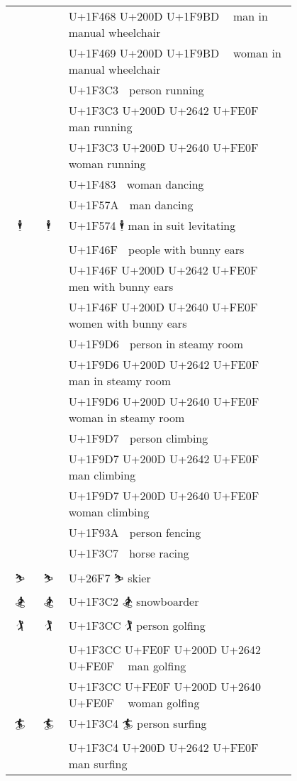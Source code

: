 \documentclass[a4paper,12pt]{article}
\newcommand{\fontA}[1]{{\fontspec[RawFeature={mode=harf,+dist,+ccmp}]{Segoe UI Emoji} #1}}
\newcommand{\fontB}[1]{{\fontspec[RawFeature={mode=harf,+dist,+ccmp}]{Noto Color Emoji} #1}}
\begin{document}
\begin{longtable}[c]{ccp{0.8\linewidth}}
\fontA{👨‍🦽}&\fontB{👨‍🦽}&U+1F468 U+200D U+1F9BD 👨‍🦽 man in manual wheelchair\\
\fontA{👩‍🦽}&\fontB{👩‍🦽}&U+1F469 U+200D U+1F9BD 👩‍🦽 woman in manual wheelchair\\
\fontA{🏃}&\fontB{🏃}&U+1F3C3 🏃 person running\\
\fontA{🏃‍♂️}&\fontB{🏃‍♂️}&U+1F3C3 U+200D U+2642 U+FE0F 🏃‍♂️ man running\\
\fontA{🏃‍♀️}&\fontB{🏃‍♀️}&U+1F3C3 U+200D U+2640 U+FE0F 🏃‍♀️ woman running\\
\fontA{💃}&\fontB{💃}&U+1F483 💃 woman dancing\\
\fontA{🕺}&\fontB{🕺}&U+1F57A 🕺 man dancing\\
\fontA{🕴}&\fontB{🕴}&U+1F574 🕴 man in suit levitating\\
\fontA{👯}&\fontB{👯}&U+1F46F 👯 people with bunny ears\\
\fontA{👯‍♂️}&\fontB{👯‍♂️}&U+1F46F U+200D U+2642 U+FE0F 👯‍♂️ men with bunny ears\\
\fontA{👯‍♀️}&\fontB{👯‍♀️}&U+1F46F U+200D U+2640 U+FE0F 👯‍♀️ women with bunny ears\\
\fontA{🧖}&\fontB{🧖}&U+1F9D6 🧖 person in steamy room\\
\fontA{🧖‍♂️}&\fontB{🧖‍♂️}&U+1F9D6 U+200D U+2642 U+FE0F 🧖‍♂️ man in steamy room\\
\fontA{🧖‍♀️}&\fontB{🧖‍♀️}&U+1F9D6 U+200D U+2640 U+FE0F 🧖‍♀️ woman in steamy room\\
\fontA{🧗}&\fontB{🧗}&U+1F9D7 🧗 person climbing\\
\fontA{🧗‍♂️}&\fontB{🧗‍♂️}&U+1F9D7 U+200D U+2642 U+FE0F 🧗‍♂️ man climbing\\
\fontA{🧗‍♀️}&\fontB{🧗‍♀️}&U+1F9D7 U+200D U+2640 U+FE0F 🧗‍♀️ woman climbing\\
\fontA{🤺}&\fontB{🤺}&U+1F93A 🤺 person fencing\\
\fontA{🏇}&\fontB{🏇}&U+1F3C7 🏇 horse racing\\
\fontA{⛷}&\fontB{⛷}&U+26F7 ⛷ skier\\
\fontA{🏂}&\fontB{🏂}&U+1F3C2 🏂 snowboarder\\
\fontA{🏌}&\fontB{🏌}&U+1F3CC 🏌 person golfing\\
\fontA{🏌️‍♂️}&\fontB{🏌️‍♂️}&U+1F3CC U+FE0F U+200D U+2642 U+FE0F 🏌️‍♂️ man golfing\\
\fontA{🏌️‍♀️}&\fontB{🏌️‍♀️}&U+1F3CC U+FE0F U+200D U+2640 U+FE0F 🏌️‍♀️ woman golfing\\
\fontA{🏄}&\fontB{🏄}&U+1F3C4 🏄 person surfing\\
\fontA{🏄‍♂️}&\fontB{🏄‍♂️}&U+1F3C4 U+200D U+2642 U+FE0F 🏄‍♂️ man surfing\\

\end{longtable}
\end{document}
